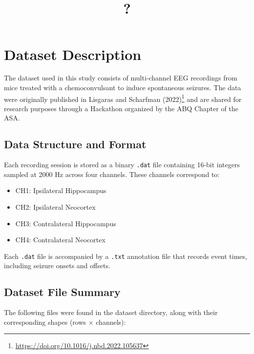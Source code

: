 \documentclass{article}
\title{?}
\author{}
\begin{document}
	
	\section{Dataset Description}
	
	The dataset used in this study consists of multi-channel EEG recordings from mice treated with a chemoconvulsant to induce spontaneous seizures. The data were originally published in Lisgaras and Scharfman (2022)\footnote{\url{https://doi.org/10.1016/j.nbd.2022.105637}} and are shared for research purposes through a Hackathon organized by the ABQ Chapter of the ASA.
	
	\subsection{Data Structure and Format}
	
	Each recording session is stored as a binary \texttt{.dat} file containing 16-bit integers sampled at 2000 Hz across four channels. These channels correspond to:
	
	\begin{itemize}
		\item CH1: Ipsilateral Hippocampus
		\item CH2: Ipsilateral Neocortex
		\item CH3: Contralateral Hippocampus
		\item CH4: Contralateral Neocortex
	\end{itemize}
	
	Each \texttt{.dat} file is accompanied by a \texttt{.txt} annotation file that records event times, including seizure onsets and offsets.
	
	\subsection{Dataset File Summary}
	
	The following files were found in the dataset directory, along with their corresponding shapes (rows $\times$ channels):
	
\end{document}
